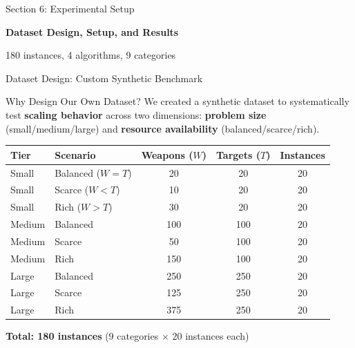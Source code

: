 \documentclass[aspectratio=43,8pt]{beamer}
\begin{document}
\begin{frame}{Section 6: Experimental Setup}
\begin{center}
{\Large\textcolor{primaryblue}{\textbf{Dataset Design, Setup, and Results}}}

\vspace{0.5cm}
{\normalsize 180 instances, 4 algorithms, 9 categories}
\end{center}
\end{frame}

\begin{frame}{Dataset Design: Custom Synthetic Benchmark}
\begin{block}{Why Design Our Own Dataset?}
We created a synthetic dataset to systematically test \textbf{scaling behavior} across two dimensions: \textbf{problem size} (small/medium/large) and \textbf{resource availability} (balanced/scarce/rich).
\end{block}

\vspace{0.2cm}
\begin{table}[h]
\centering
\small
\begin{tabular}{llccc}
\toprule
\textbf{Tier} & \textbf{Scenario} & \textbf{Weapons ($W$)} & \textbf{Targets ($T$)} & \textbf{Instances} \\
\midrule
Small & Balanced ($W = T$) & 20 & 20 & 20 \\
Small & Scarce ($W < T$) & 10 & 20 & 20 \\
Small & Rich ($W > T$) & 30 & 20 & 20 \\
\midrule
Medium & Balanced & 100 & 100 & 20 \\
Medium & Scarce & 50 & 100 & 20 \\
Medium & Rich & 150 & 100 & 20 \\
\midrule
Large & Balanced & 250 & 250 & 20 \\
Large & Scarce & 125 & 250 & 20 \\
Large & Rich & 375 & 250 & 20 \\
\bottomrule
\end{tabular}
\end{table}

\begin{center}
\textbf{Total: 180 instances} (9 categories $\times$ 20 instances each)
\end{center}
\end{frame}
\end{document}
